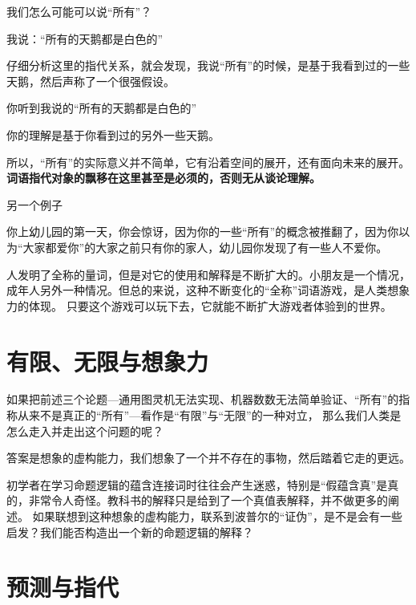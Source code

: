 \documentclass[a4paper,12pt]{article}
\numberwithin{problem}{section}
\numberwithin{definition}{section}
\numberwithin{lemma}{section}
\numberwithin{proposition}{section}
\numberwithin{theorem}{section}
\numberwithin{grammar}{section}
\numberwithin{program}{section}
\numberwithin{convention}{section}
\numberwithin{corollary}{section}
\begin{document}
我们怎么可能可以说“所有”？

\begin{displayquote}
我说：“所有的天鹅都是白色的”
\end{displayquote}

仔细分析这里的指代关系，就会发现，我说“所有”的时候，是基于我看到过的一些天鹅，然后声称了一个很强假设。

\begin{displayquote}
你听到我说的“所有的天鹅都是白色的”
\end{displayquote}

你的理解是基于你看到过的另外一些天鹅。

所以，“所有”的实际意义并不简单，它有沿着空间的展开，还有面向未来的展开。\textbf{词语指代对象的飘移在这里甚至是必须的，否则无从谈论理解。}

另一个例子
\begin{displayquote}
你上幼儿园的第一天，你会惊讶，因为你的一些“所有”的概念被推翻了，因为你以为“大家都爱你”的大家之前只有你的家人，幼儿园你发现了有一些人不爱你。
\end{displayquote}

人发明了全称的量词，但是对它的使用和解释是不断扩大的。小朋友是一个情况，成年人另外一种情况。但总的来说，这种不断变化的“全称”词语游戏，是人类想象力的体现。
只要这个游戏可以玩下去，它就能不断扩大游戏者体验到的世界。

\section{有限、无限与想象力}

如果把前述三个论题—通用图灵机无法实现、机器数数无法简单验证、“所有”的指称从来不是真正的“所有”—看作是“有限”与“无限”的一种对立，
那么我们人类是怎么走入并走出这个问题的呢？

\begin{displayquote}
答案是想象的虚构能力，我们想象了一个并不存在的事物，然后踏着它走的更远。
\end{displayquote}

初学者在学习命题逻辑的蕴含连接词时往往会产生迷惑，特别是“假蕴含真”是真的，非常令人奇怪。教科书的解释只是给到了一个真值表解释，并不做更多的阐述。
如果联想到这种想象的虚构能力，联系到波普尔的“证伪”，是不是会有一些启发？我们能否构造出一个新的命题逻辑的解释？

\section{预测与指代}
\end{document}
